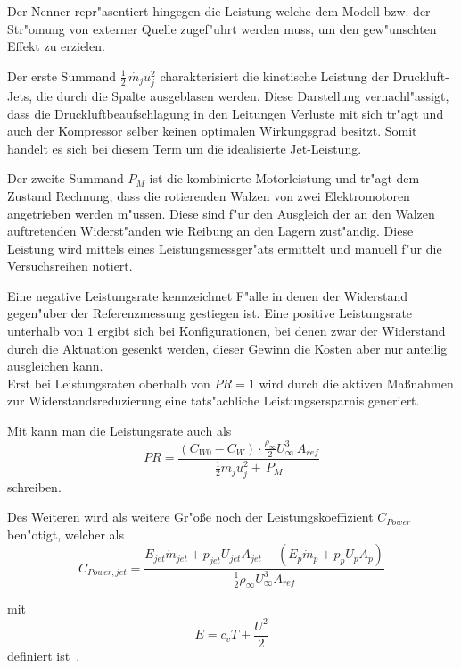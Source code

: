 Der Nenner repr"asentiert hingegen die Leistung welche dem Modell bzw. der Str"omung von externer Quelle zugef"uhrt werden muss, um den gew"unschten Effekt zu erzielen.

Der erste Summand $\frac{1}{2}\,\dot{m_j} u_j^2$ charakterisiert die kinetische Leistung der Druckluft-Jets, die durch die Spalte ausgeblasen werden. Diese Darstellung vernachl"assigt, dass die  Druckluftbeaufschlagung in den Leitungen Verluste mit sich tr"agt und auch der Kompressor selber keinen optimalen Wirkungsgrad besitzt. Somit handelt es sich bei diesem Term um die idealisierte Jet-Leistung.

Der zweite Summand $ P_M$ ist die kombinierte Motorleistung und tr"agt dem Zustand Rechnung, dass die rotierenden Walzen von zwei Elektromotoren angetrieben werden m"ussen. Diese sind f"ur den Ausgleich der an den Walzen auftretenden Widerst"anden wie Reibung an den Lagern zust"andig.
Diese Leistung wird mittels eines Leistungsmessger"ats ermittelt und manuell f"ur die Versuchsreihen notiert.

Eine negative Leistungsrate kennzeichnet F"alle in denen der Widerstand gegen"uber der Referenzmessung gestiegen ist. Eine positive Leistungsrate unterhalb von $1$ ergibt sich bei Konfigurationen, bei denen zwar der Widerstand durch die Aktuation gesenkt werden, dieser Gewinn die Kosten aber nur anteilig ausgleichen kann.\\
Erst bei Leistungsraten oberhalb von $PR = 1$ wird durch die aktiven Ma\ss{}nahmen zur Widerstandsreduzierung eine tats"achliche Leistungsersparnis generiert.

Mit  kann man die Leistungsrate auch als
\begin{equation}
	\label{eq:leistungsrate_cw}
	PR = \frac{(C_{W0} - C_W)\cdot \frac{\rho_{\infty}}{2} U^3_{\infty}\,A_{ref}}{\frac{1}{2} \dot{m_j} u_j^2 + \, P_M}
\end{equation}
schreiben.

Des Weiteren wird als weitere Gr"o\ss{}e noch der Leistungskoeffizient $C_{Power}$ ben"otigt, welcher als
\begin{equation}
	\label{eq:def-powercoefficient}
	C_{Power,jet} = \frac{E_{jet}\dot{m}_{jet} + p_{jet}U_{jet}A_{jet} - (E_p\dot{m}_p + p_p U_p A_p)}{\frac{1}{2}\rho_{\infty}U^3_{\infty} A_{ref}}
\end{equation}

mit
\begin{equation}
	\label{eq:def-energieterm}
	E = c_vT + \frac{U^2}{2}
\end{equation}		
definiert ist~\cite{Hucho.2011}.

